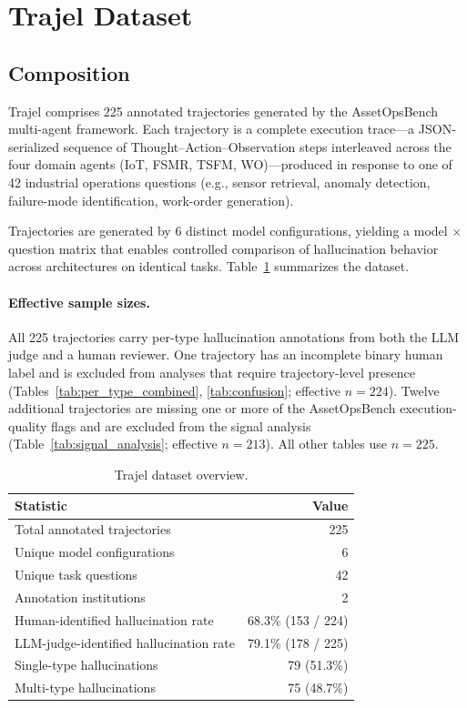 \documentclass{article}
\begin{document}
\section{Trajel Dataset}
\label{sec:dataset}

\subsection{Composition}
\label{sec:dataset_composition}

Trajel comprises 225 annotated trajectories generated by the AssetOpsBench multi-agent framework. Each trajectory is a complete execution trace---a JSON-serialized sequence of Thought--Action--Observation steps interleaved across the four domain agents (IoT, FSMR, TSFM, WO)---produced in response to one of 42 industrial operations questions (e.g., sensor retrieval, anomaly detection, failure-mode identification, work-order generation).

Trajectories are generated by 6 distinct model configurations, yielding a model $\times$ question matrix that enables controlled comparison of hallucination behavior across architectures on identical tasks. Table~\ref{tab:dataset_overview} summarizes the dataset.

\paragraph{Effective sample sizes.}
All 225 trajectories carry per-type hallucination annotations from both the LLM judge and a human reviewer. One trajectory has an incomplete binary human label and is excluded from analyses that require trajectory-level presence (Tables~\ref{tab:per_type_combined}, \ref{tab:confusion}; effective $n = 224$). Twelve additional trajectories are missing one or more of the AssetOpsBench execution-quality flags and are excluded from the signal analysis (Table~\ref{tab:signal_analysis}; effective $n = 213$). All other tables use $n = 225$.

\begin{table}[t]
\caption{Trajel dataset overview.}
\label{tab:dataset_overview}
\centering
\small
\begin{tabular}{lr}
\toprule
\textbf{Statistic} & \textbf{Value} \\
\midrule
Total annotated trajectories & 225 \\
Unique model configurations & 6 \\
Unique task questions & 42 \\
Annotation institutions & 2 \\
\midrule
Human-identified hallucination rate & 68.3\% (153 / 224) \\
LLM-judge-identified hallucination rate & 79.1\% (178 / 225) \\
\midrule
Single-type hallucinations & 79 (51.3\%) \\
Multi-type hallucinations & 75 (48.7\%) \\
\bottomrule
\end{tabular}
\vspace{-0.1in}
\end{table}
\end{document}
